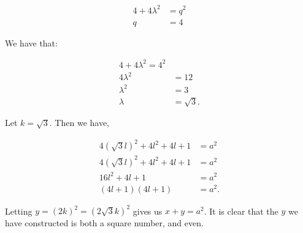 \documentclass{article}
\begin{document}
\begin{align*}
4 + 4\lambda^2 &= q^2 \\
q &= 4
\end{align*}

We have that:

\begin{align*}
4 + 4\lambda^2 = 4^2 \\
4\lambda^2 &= 12 \\
\lambda^2 &= 3 \\
\lambda &= \sqrt{3}.
\end{align*}

Let $k = \sqrt{3}$. Then we have,

\begin{align*}
4(\sqrt{3}l)^2 + 4l^2 + 4l + 1 &= a^2 \\
4(\sqrt{3}l)^2 + 4l^2 + 4l + 1 &= a^2 \\
16l^2 + 4l + 1 &= a^2 \\
(4l + 1)(4l + 1) &= a^2.
\end{align*}

Letting $y = (2k)^2 = (2\sqrt{3}k)^2$ gives us $x + y = a^2$. It is clear that the $y$ we have constructed is both a square number, and even.
\end{document}
